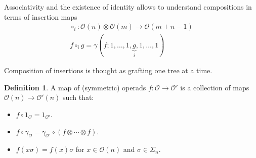\documentclass{beamer}
\theoremstyle{definition}
\newtheorem{defi}{Definition}
\begin{document}
\begin{frame}[fragile]
	Associativity and the existence of identity allows to understand compositions in terms of insertion maps \begin{align*}
	\circ_i:\mathcal{O}(n)\otimes\mathcal{O}(m)\to \mathcal{O}(m+n-1)\\ f\circ_i g=\gamma(f;1,\dots, 1,\underbrace{g}_{i},1,\dots, 1)
\end{align*} \pause
	
	Composition of insertions is thought as grafting one tree at a time.
	


\end{frame}
\begin{frame}
	\begin{defi}
	 A map of (symmetric) operads $f:\mathcal{O}\to \mathcal{O}'$ is a collection of maps $\mathcal{O}(n)\to \mathcal{O}'(n)$ such that:
		\begin{itemize}
			\item<1->   $f\circ 1_\mathcal{O}=1_{\mathcal{O}'}$.
			\item<2->  $f\circ \gamma_\mathcal{O}=\gamma_{\mathcal{O}'}\circ (f\otimes\cdots\otimes f)$.
			\item<3->   $f(x\sigma)=f(x)\sigma$ for $x\in\mathcal{O}(n)$ and $\sigma\in\Sigma_n$.
		\end{itemize}
	\end{defi}
	
	
\end{frame}
%	
\end{document}
